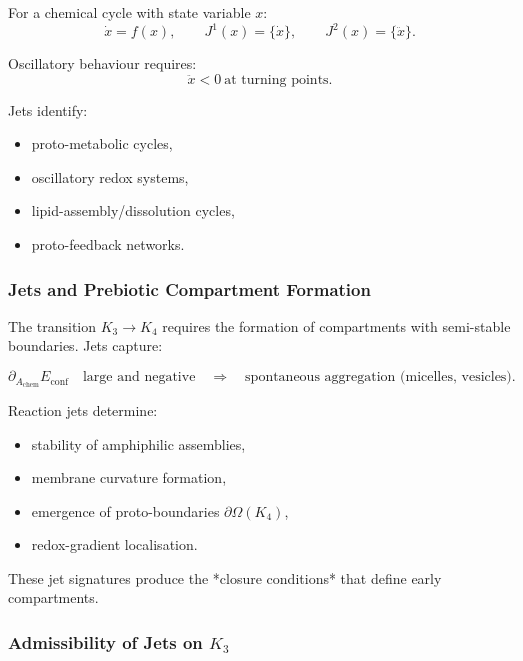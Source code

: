 For a chemical cycle with state variable $x$:
\[
\dot{x}=f(x),
\qquad
J^1(x)=\{\dot{x}\},
\qquad
J^2(x)=\{\ddot{x}\}.
\]

Oscillatory behaviour requires:
\[
\ddot{x}<0\ \text{at turning points}.
\]

Jets identify:

\begin{itemize}
    \item proto-metabolic cycles,
    \item oscillatory redox systems,
    \item lipid-assembly/dissolution cycles,
    \item proto-feedback networks.
\end{itemize}



\subsubsection{Jets and Prebiotic Compartment Formation}

The transition $K_3\to K_4$ requires the formation of compartments with
semi-stable boundaries. Jets capture:

\[
\partial_{A_{\mathrm{chem}}}E_{\mathrm{conf}}
\quad\text{large and negative}
\quad\Longrightarrow\quad
\text{spontaneous aggregation (micelles, vesicles)}.
\]

Reaction jets determine:

\begin{itemize}
    \item stability of amphiphilic assemblies,
    \item membrane curvature formation,
    \item emergence of proto-boundaries $\partial\Omega(K_4)$,
    \item redox-gradient localisation.
\end{itemize}

These jet signatures produce the *closure conditions* that define early
compartments.



\subsubsection{Admissibility of Jets on \texorpdfstring{$K_3$}{K_3}}

